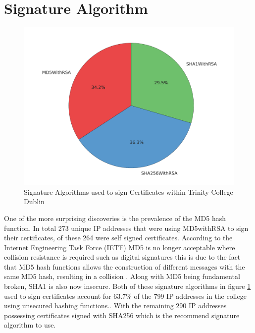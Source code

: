 \documentclass[a4wide,leqno,12pt]{report}
\begin{document}
\section{Signature Algorithm}
\begin{figure}[H]
\centering
\includegraphics[scale=.45]{pdf_images/signatureAlgorithms}
\caption{Signature Algorithms used to sign Certificates within Trinity College Dublin}
\label{fig:signatureAlgorithms}
\end{figure}

One of the more surprising discoveries is the prevalence of the MD5 hash function. In total 273 unique IP addresses that were using MD5withRSA to sign their certificates, of these 264 were self signed certificates. According to the Internet Engineering Task Force (IETF) MD5 is no longer acceptable where collision resistance is required
such as digital signatures \cite{turner2011updated} this is due to the fact that MD5 hash functions allows the construction of different messages with the same MD5 hash,  resulting in a collision \cite{md5}. Along with MD5 being fundamental broken, SHA1 is also now insecure. Both of these signature algorithms in figure \ref{fig:signatureAlgorithms} used to sign certificates account for 63.7\% of the 799 IP addresses in the college using unsecured hashing functions.\cite{ssllabs}. With the remaining 290 IP addresses possessing certificates signed with SHA256 which is the recommend signature algorithm to use\cite{ssllabs}.
\end{document}
